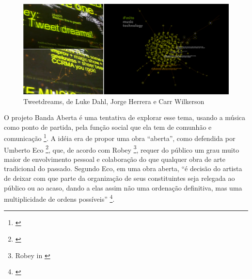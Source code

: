 \begin{figure}
    \caption{\label{crowdincloud}Tweetdreams, de Luke Dahl, Jorge Herrera e Carr Wilkerson}
    \begin{center}
        \includegraphics[width=1\linewidth]{pictures/cap3/tweetdreams}
    \end{center}
\end{figure}



O projeto Banda Aberta é uma tentativa de explorar esse tema, usando a música como ponto de partida, pela função social que ela tem de comunhão e comunicação \footnote{\cite{Koelsch:2014}}. A idéia era de propor uma obra ``aberta'', como defendida por Umberto Eco \footnote{\cite{Eco1991}}, que, de acordo com Robey \footnote{Robey in \cite{Eco1991}}, requer do público um grau muito maior de envolvimento pessoal e colaboração do que qualquer obra de arte tradicional do passado. Segundo Eco, em uma obra aberta, ``é decisão do artista de deixar com que parte da organização de seus constituintes seja relegada ao público ou ao acaso, dando a elas assim não uma ordenação definitiva, mas uma multiplicidade de ordens possíveis'' \footnote{\cite{Eco1991}}.

